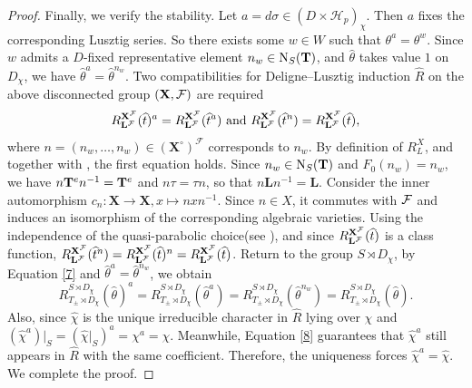 \documentclass[11pt,a4paper]{article}
\numberwithin{equation}{section}
\theoremstyle{definition}
\theoremstyle{remark}
\newcommand{\HH}{\mathcal H}
\newcommand{\NN}{\mathrm N}
\begin{document}
\begin{proof}
Finally, we verify the stability. Let
$a=d\sigma\in (D\times \HH_p)_\chi$. 
Then $a$ fixes the corresponding Lusztig series.
So there exists some $w\in W$ such that $\theta^a=\theta^w$.
Since $w$ admits a $D$-fixed representative element $n_w\in\NN_S({\bf T})$, and $\widehat{\theta}$ takes value $1$ on $D_\chi$, we have
$\widehat{\theta}^a=\widehat{\theta}^{n_w}$.  Two compatibilities for Deligne–Lusztig induction ${\widehat R}$ on the above disconnected group $({\bf X}, \cal F)$ are required
\begin{equation}\label{7}
R_{{\bf L}^{\cal F}}^{{\bf X}^{\cal F}}(\widehat t)^a=R_{{\bf L}^{\cal F}}^{{\bf X}^{\cal F}}(\widehat{t}^a)
\ \text{and}\ R_{{\bf L}^{\cal F}}^{{\bf X}^{\cal F}}(\widehat{t}^{n})=R_{{\bf L}^{\cal F}}^{{\bf X}^{\cal F}}(\widehat{t}),
\end{equation}
where $n=(n_w,\ldots,n_w)\in(\mathbf X^\circ)^{\mathcal F}$ 
corresponds to $n_w$. By definition of ${R}_L^X$, and together with \cite[Proposition 3.3]{DL}, the first equation holds. Since $n_w\in\NN_S({\bf T})$ and $F_0(n_w)=n_w$,
we have 
$n{\bf T}^en^{-1}={\bf T}^e$ and $n\tau=\tau n$, so that
$n\mathbf L n^{-1}=\mathbf L$. 
Consider the inner automorphism $c_n:\mathbf X\rightarrow\mathbf X, x\mapsto nxn^{-1}$.
Since \(n\in X\), it commutes with \(\cal F\) and induces an isomorphism of the corresponding algebraic varieties.
Using the independence of the quasi-parabolic choice(see \cite[Theorem 4.8.13]{GM20}), and since $R_{{\bf L}^{\cal F}}^{{\bf X}^{\cal F}}(\widehat t)$ is a  class function, 
$R_{{\bf L}^{\cal F}}^{{\bf X}^{\cal F}}(\widehat{t}^{n})=R_{{\bf L}^{\cal F}}^{{\bf X}^{\cal F}}(\widehat{t})^n=R_{{\bf L}^{\cal F}}^{{\bf X}^{\cal F}}(\widehat{t})$.
Return to the group $S\rtimes D_\chi$, by Equation \eqref{7} and
$\widehat{\theta}^a=\widehat{\theta}^{n_w}$, we obtain
\begin{equation}\label{8}
R_{T_\pm\rtimes D_\chi}^{S\rtimes D_\chi}(\widehat \theta)^a=R_{T_\pm\rtimes D_\chi}^{S\rtimes D_\chi}(\widehat \theta^a)=R_{T_\pm\rtimes D_\chi}^{S\rtimes D_\chi}(\widehat \theta^{n_w})=R_{T_\pm\rtimes D_\chi}^{S\rtimes D_\chi}(\widehat \theta).    
\end{equation}
Also, since \(\widehat\chi\) is the unique irreducible character in \(\widehat R\) lying over \(\chi\) and
$(\widehat\chi^a)|_S=(\widehat\chi|_S)^a=\chi^a=\chi$.
Meanwhile, Equation \eqref{8} guarantees that \(\widehat\chi^a\) still appears in \(\widehat R\) with the same coefficient. Therefore, the uniqueness forces $\widehat\chi^a=\widehat\chi$. We complete the proof.
\end{proof}
\end{document}

